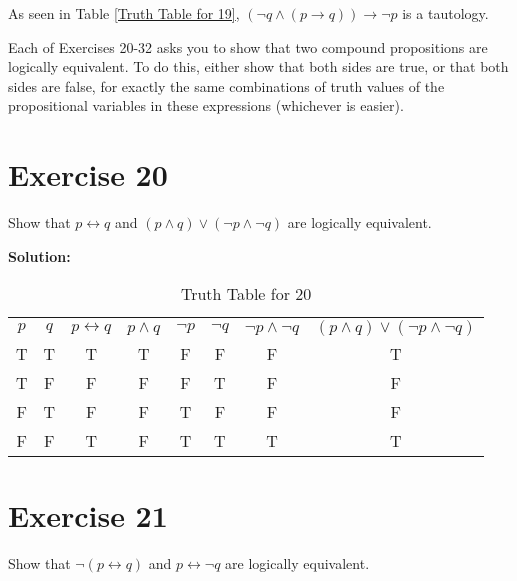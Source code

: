 \documentclass{Axon}
\begin{document}
As seen in Table \ref{Truth Table for 19}, \((\lnot q \land (p \to q)) \to \lnot p\) is a tautology.

Each of Exercises 20-32 asks you to show that two compound propositions are logically equivalent. To do this, either show that both sides are true, or that both sides are false, for exactly the same combinations of truth values of the propositional variables in these expressions (whichever is easier).

\section*{Exercise 20}
Show that \(p \leftrightarrow q\) and \((p \land q) \lor (\lnot p \land \lnot q)\) are logically equivalent.

\noindent
\textbf{Solution:}
\begin{table}[ht]
    \centering
    \begin{tabular}{c|c|c|c|c|c|c|c}
        \(p\) & \(q\) & \(p \leftrightarrow q\) & \(p \land q\) & \(\lnot p\) & \(\lnot q\) & \(\lnot p \land \lnot q\) & \((p \land q) \lor (\lnot p \land \lnot q)\) \\
        T     & T     & T                       & T             & F           & F           & F                         & T                                            \\
        T     & F     & F                       & F             & F           & T           & F                         & F                                            \\
        F     & T     & F                       & F             & T           & F           & F                         & F                                            \\
        F     & F     & T                       & F             & T           & T           & T                         & T
    \end{tabular}
    \caption{Truth Table for 20}
\end{table}

\section*{Exercise 21}
Show that \(\lnot(p \leftrightarrow q)\) and \(p \leftrightarrow \lnot q\) are logically equivalent.
\end{document}
